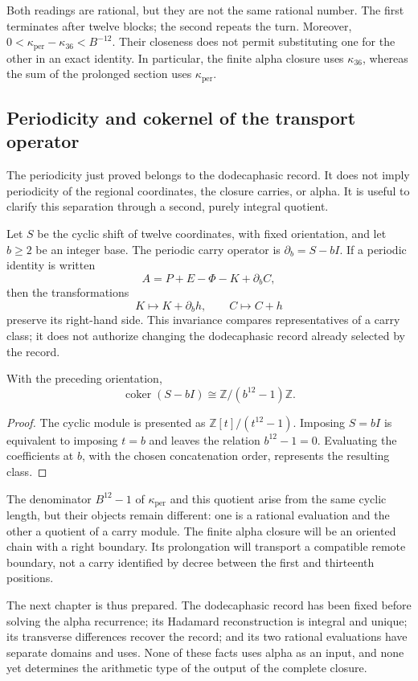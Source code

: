 Both readings are rational, but they are not the same rational number. The first
terminates after twelve blocks; the second repeats the turn. Moreover,
\(0<\kappa_{\mathrm{per}}-\kappa_{36}<B^{-12}\). Their closeness does not
permit substituting one for the other in an exact identity. In particular,
the finite alpha closure uses \(\kappa_{36}\), whereas the
sum of the prolonged section uses \(\kappa_{\mathrm{per}}\).



\subsection{Periodicity and cokernel of the transport operator}
\label{subsec:k-clase-acarreo}

The periodicity just proved belongs to the dodecaphasic record. It does not imply
periodicity of the regional coordinates, the closure carries,
or alpha. It is useful to clarify this separation through a second,
purely integral quotient.

Let \(S\) be the cyclic shift of twelve coordinates, with fixed
orientation, and let \(b\geq2\) be an integer base. The periodic
carry operator is \(\partial_b=S-bI\). If a periodic identity is written
\[
 A=P+E-\Phi-K+\partial_bC,
\]
then the transformations
\[
 K\longmapsto K+\partial_bh,\qquad C\longmapsto C+h
\]
preserve its right-hand side. This invariance compares representatives of a
carry class; it does not authorize changing the dodecaphasic record already
selected by the record.

\begin{proposition}
\label{prop:k-cociente-acarreo}
With the preceding orientation,
\[
 \operatorname{coker}(S-bI)\cong\mathbb Z/(b^{12}-1)\mathbb Z.
\]
\end{proposition}

\begin{proof}
The cyclic module is presented as
\(\mathbb Z[t]/(t^{12}-1)\). Imposing \(S=bI\) is equivalent to imposing
\(t=b\) and leaves the relation \(b^{12}-1=0\). Evaluating the
coefficients at \(b\), with the chosen concatenation order, represents
the resulting class.
\end{proof}

The denominator \(B^{12}-1\) of \(\kappa_{\mathrm{per}}\) and this
quotient arise from the same cyclic length, but their objects remain
different: one is a rational evaluation and the other a quotient
of a carry module. The finite alpha closure will be an oriented
chain with a right boundary. Its prolongation will transport a
compatible remote boundary, not a carry identified by decree
between the first and thirteenth positions.

The next chapter is thus prepared. The dodecaphasic record has been fixed before
solving the alpha recurrence; its Hadamard reconstruction is
integral and unique; its transverse differences recover the record; and
its two rational evaluations have separate domains and uses. None
of these facts uses alpha as an input, and none yet determines the
arithmetic type of the output of the complete closure.
